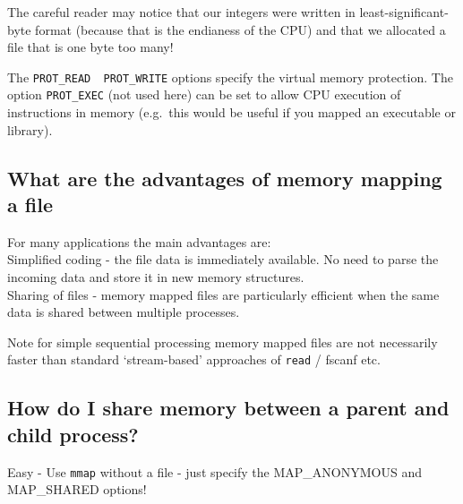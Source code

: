 The careful reader may notice that our integers were written in
least-significant-byte format (because that is the endianess of the CPU)
and that we allocated a file that is one byte too many!

The \texttt{PROT\_READ\ \textbar{}\ PROT\_WRITE} options specify the
virtual memory protection. The option \texttt{PROT\_EXEC} (not used
here) can be set to allow CPU execution of instructions in memory
(e.g.~this would be useful if you mapped an executable or library).

\subsection{What are the advantages of memory mapping a
file}\label{what-are-the-advantages-of-memory-mapping-a-file}

For many applications the main advantages are:\\Simplified coding - the
file data is immediately available. No need to parse the incoming data
and store it in new memory structures.\\Sharing of files - memory mapped
files are particularly efficient when the same data is shared between
multiple processes.

Note for simple sequential processing memory mapped files are not
necessarily faster than standard `stream-based' approaches of
\texttt{read} / fscanf etc.

\subsection{How do I share memory between a parent and child
process?}\label{how-do-i-share-memory-between-a-parent-and-child-process}

Easy - Use \texttt{mmap} without a file - just specify the
MAP\_ANONYMOUS and MAP\_SHARED options!

